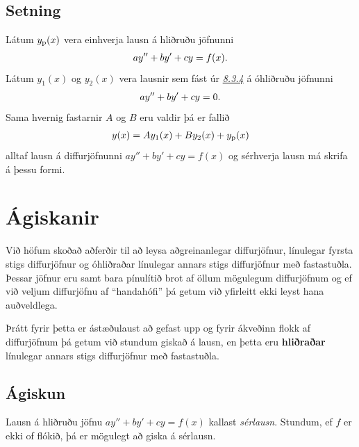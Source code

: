 \documentclass[a4paper,10pt,icelandic]{sphinxmanual}
\begin{document}
\subsection{Setning}
\label{kafli08:id4}
Látum \(y_{\rm p}(x)\) vera einhverja lausn á hliðruðu jöfnunni
\begin{gather}
\begin{split}ay''+by'+cy=f(x).\end{split}\notag
\end{gather}
Látum \(y_1(x)\) og \(y_2(x)\) vera lausnir sem fást úr {\hyperref[kafli08:stigs\string-ohlidrud]{\emph{8.3.4}}} á
óhliðruðu jöfnunni
\begin{gather}
\begin{split}ay''+by'+cy=0.\end{split}\notag
\end{gather}
Sama hvernig fastarnir \(A\) og \(B\) eru valdir þá er fallið
\begin{gather}
\begin{split}y(x)=Ay_1(x)+By_2(x)+y_{\rm p}(x)\end{split}\notag
\end{gather}
alltaf lausn á diffurjöfnunni \(ay''+by'+cy=f(x)\) og sérhverja
lausn má skrifa á þessu formi.


\section{Ágiskanir}
\label{kafli08:agiskanir}
Við höfum skoðað aðferðir til að leysa aðgreinanlegar diffurjöfnur,
línulegar fyrsta stigs diffurjöfnur og óhliðraðar línulegar
annars stigs diffurjöfnur með fastastuðla. Þessar jöfnur eru
samt bara pínulítið brot af öllum mögulegum diffurjöfnum og ef við
veljum diffurjöfnu af ``handahófi'' þá getum við yfirleitt ekki
leyst hana auðveldlega.

Þrátt fyrir þetta er ástæðulaust að gefast upp og fyrir ákveðinn flokk
af diffurjöfnum þá getum við stundum giskað á lausn, en þetta eru
\textbf{hliðraðar} línulegar annars stigs diffurjöfnur með fastastuðla.


\subsection{Ágiskun}
\label{kafli08:id5}\label{kafli08:index-7}\label{kafli08:agiskun}
Lausn á hliðruðu jöfnu \(ay''+by'+cy=f(x)\) kallast \emph{sérlausn}.
Stundum, ef \(f\) er ekki of flókið, þá er mögulegt að giska á sérlausn.
\end{document}
